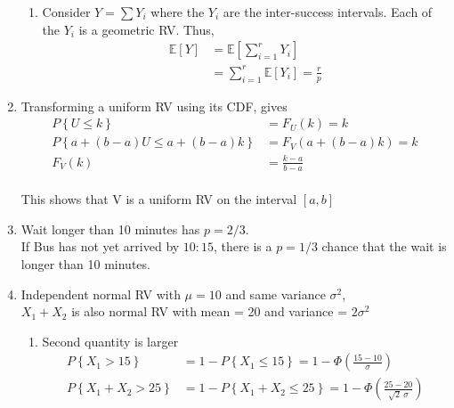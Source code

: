 \begin{enumerate}
\begin{enumerate}
			\item Consider $ Y = \sum Y_i $ where the $ Y_i $ are the inter-success intervals. Each of the $ Y_i $ is a geometric RV. Thus,\\
			\begin{align}
				\mathbb{E}[Y] &= \mathbb{E}\left[\sum\limits_{i = 1}^{r} Y_i\right] \nonumber \\
				&= \sum\limits_{i = 1}^{r} \mathbb{E}[Y_i] = \frac{r}{p}
			\end{align}
			
		\end{enumerate}
	
	
	
	\item Transforming a uniform RV using its CDF, gives\\
	
		\begin{align}
			P \left\{U \leq k \right\} &= F_U(k) = k \nonumber \\
			P \left\{a + (b-a)U \leq a + (b-a)k \right\} &= F_V (a + (b-a)k) = k \nonumber \\
			F_V(k) &= \frac{k-a}{b-a}
		\end{align}\\
		
		This shows that V is a uniform RV on the interval $ [a, b] $\\
	 
	
	\item Wait longer than 10 minutes has $ p = 2/3 $. \\
	If Bus has not yet arrived by $ 10:15 $, there is a $ p = 1/3 $ chance that the wait is longer than 10 minutes. \\
	
	\item Independent normal RV with $ \mu = 10 $ and same variance $ \sigma^2 $,\\
	$ X_1 + X_2 $ is also normal RV with mean = 20 and variance = $ 2 \sigma^2 $
	
		\begin{enumerate}
			\item Second quantity is larger
			\begin{align}
				P \left\{X_1 > 15\right\} &= 1 - P \left\{X_1 \leq 15\right\} = 1 - \Phi\left(\frac{15 - 10}{\sigma}\right) \nonumber \\
				P \left\{X_1 + X_2 > 25\right\} &= 1 - P \left\{X_1 + X_2 \leq 25\right\} = 1 - \Phi\left(\frac{25  -  20}{\sqrt{2}\ \sigma}\right) 
			\end{align}\\
			

\end{enumerate}
\end{enumerate}

